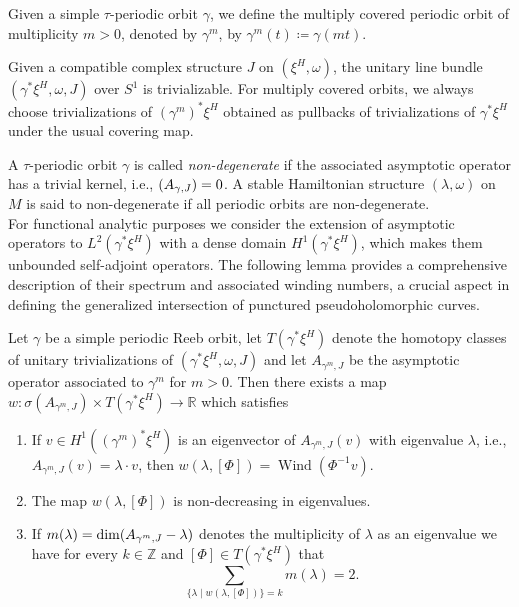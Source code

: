 \documentclass[11pt, a4paper]{amsart}
\let\ker\relax
\DeclareMathOperator{\ker}{Ker}
\DeclareMathOperator{\wind}{Wind}
\begin{document}
Given a simple $\tau$-periodic orbit $\gamma$, we define the multiply covered periodic orbit of multiplicity $m>0$, denoted by $\gamma^m$, by $\gamma^m(t) \coloneq \gamma(mt)$. 

Given a compatible complex structure $J$ on $(\xi^{H},\omega)$, the unitary line bundle $(\gamma^{*}\xi^{H},\omega,J)$ over $S^1$ is trivializable. For multiply covered orbits, we always choose trivializations of $(\gamma^{m})^{*}\xi^{H}$ obtained as pullbacks of trivializations of $\gamma^{*}\xi^{H}$ under the usual covering map.

A $\tau$-periodic orbit $\gamma$ is called \textit{non-degenerate}  if the associated asymptotic operator has a trivial kernel, i.e., $\ker(A_{\gamma,J})=0$. A stable Hamiltonian structure $(\lambda,\omega)$ on $M$ is said to non-degenerate if all periodic orbits are non-degenerate.\\

For functional analytic purposes we consider the extension of asymptotic operators to $L^2(\gamma^*\xi^{H})$ with a dense domain $H^1(\gamma^*\xi^{H})$, which makes them unbounded self-adjoint operators. The following lemma provides a comprehensive description of their spectrum and associated winding numbers, a crucial aspect in defining the generalized intersection of punctured pseudoholomorphic curves.
\begin{lemma} \cite[Section~3]{HWZ2}\label{asymptotic_dimension}
Let $\gamma$ be a simple periodic Reeb orbit, let $T(\gamma^* \xi^H)$ denote the homotopy classes of unitary trivializations of $(\gamma^* \xi^H , \omega, J)$ and let $A_{\gamma^m,J}$ be the asymptotic operator associated to $\gamma^m$ for $m>0$. Then there exists a map $w\colon \sigma(A_{\gamma^m ,J}) \times T(\gamma^* \xi^H ) \rightarrow \mathbb{R}$ which satisfies

\begin{enumerate}[topsep=5pt,itemsep=5pt]
    \item If $v \in H^1((\gamma^m)^*\xi^{H})$ is an eigenvector of $A_{\gamma^m,J} (v)$ with eigenvalue $\lambda$, i.e., $A_{\gamma^m,J} (v) = \lambda \cdot v$, then $w(\lambda, [\Phi]) = \wind(\Phi^{-1} v)$.
    \item The map $w(\lambda, [\Phi])$ is non-decreasing in eigenvalues.
    \item If $m(\lambda) = \dim \ker(A_{\gamma^m,J} - \lambda)$ denotes the multiplicity of $\lambda$ as an eigenvalue we have for every $k \in \mathbb{Z}$ and $[\Phi] \in T(\gamma^* \xi^H)$ that $$\sum_{\{\lambda \mid w(\lambda,[\Phi])\}=k} m(\lambda) = 2.$$

\end{enumerate}
\end{lemma}
\end{document}
